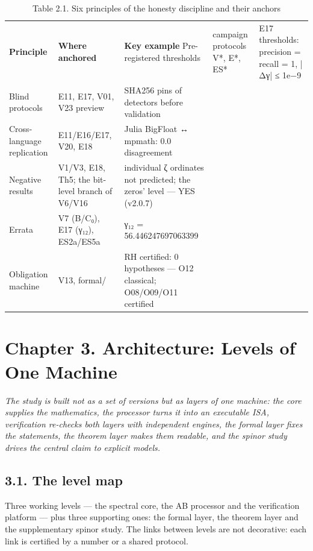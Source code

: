 \documentclass[11pt,a4paper]{article}
\begin{document}
\begin{table}[htbp]\centering\small
\caption{Table 2.1. Six principles of the honesty discipline and their anchors}
\begin{tabular}{p{} p{} p{}}
\toprule
\textbf{Principle} & \textbf{Where anchored} & \textbf{Key example}
\midrule
Pre-registered thresholds & campaign protocols V*, E*, ES* & E17 thresholds: precision = recall = 1, |Δγ| ≤ 1e−9 \\
Blind protocols & E11, E17, V01, V23 preview & SHA256 pins of detectors before validation \\
Cross-language replication & E11/E16/E17, V20, E18 & Julia BigFloat ↔ mpmath: 0.0 disagreement \\
Negative results & V1/V3, E18, Th5; the bit-level branch of V6/V16 & individual ζ ordinates not predicted; the zeros' level — YES (v2.0.7) \\
Errata & V7 (B/C₀), E17 (γ₁₂), ES2a/ES5a & γ₁₂ = 56.446247697063399 \\
Obligation machine & V13, formal/ & RH certified: 0 hypotheses — O12 classical; O08/O09/O11 certified \\
\bottomrule
\end{tabular}
\end{table}

\section{Chapter 3. Architecture: Levels of One Machine}

\noindent\textit{\color{copper}The study is built not as a set of versions but as layers of one machine: the core supplies the mathematics, the processor turns it into an executable ISA, verification re-checks both layers with independent engines, the formal layer fixes the statements, the theorem layer makes them readable, and the spinor study drives the central claim to explicit models.}

\subsection{3.1. The level map}

Three working levels — the spectral core, the AB processor and the verification platform — plus three supporting ones: the formal layer, the theorem layer and the supplementary spinor study. The links between levels are not decorative: each link is certified by a number or a shared protocol.
\end{document}
